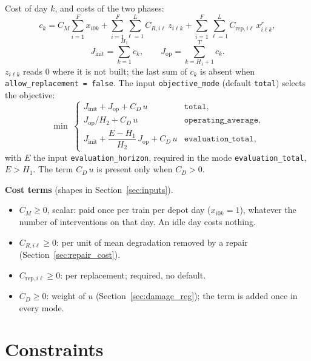Cost of day $k$, and costs of the two phases:
\begin{equation}
  c_k = C_M \sum_{i=1}^{F} x_{i0k}
      + \sum_{i=1}^{F}\sum_{\ell=1}^{L} C_{R,i\ell}\, z_{i\ell k}
      + \sum_{i=1}^{F}\sum_{\ell=1}^{L} C_{\mathrm{rep},i\ell}\, x^r_{i\ell k},
  \label{eq:a_daycost}
\end{equation}
\begin{equation}
  J_{\mathrm{init}} = \sum_{k=1}^{H_1} c_k, \qquad
  J_{\mathrm{op}} = \sum_{k=H_1+1}^{T} c_k .
  \label{eq:a_phases}
\end{equation}
$z_{i\ell k}$ reads $0$ where it is not built; the last sum of $c_k$ is absent when
\texttt{allow\_replacement = false}. The input \texttt{objective\_mode} (default
\texttt{total}) selects the objective:
\begin{equation}
  \min\;
  \begin{cases}
    J_{\mathrm{init}} + J_{\mathrm{op}} + C_D\, u & \texttt{total}, \\[2pt]
    J_{\mathrm{op}} / H_2 + C_D\, u & \texttt{operating\_average}, \\[2pt]
    J_{\mathrm{init}} + \dfrac{E - H_1}{H_2}\, J_{\mathrm{op}} + C_D\, u
      & \texttt{evaluation\_total},
  \end{cases}
  \label{eq:a_objective}
\end{equation}
with $E$ the input \texttt{evaluation\_horizon}, required in the mode
\texttt{evaluation\_total}, $E > H_1$. The term $C_D\,u$ is present only when
$C_D > 0$.

\textbf{Cost terms} (shapes in Section~\ref{sec:inputs}).
\begin{itemize}[nosep,leftmargin=1.5em]
  \item $C_M \geq 0$, scalar: paid once per train per depot day ($x_{i0k} = 1$),
        whatever the number of interventions on that day. An idle day costs nothing.
  \item $C_{R,i\ell} \geq 0$: per unit of mean degradation removed by a repair
        (Section~\ref{sec:repair_cost}).
  \item $C_{\mathrm{rep},i\ell} \geq 0$: per replacement; required, no default.
  \item $C_D \geq 0$: weight of $u$ (Section~\ref{sec:damage_reg}); the term is added
        once in every mode.
\end{itemize}

\section{Constraints}
\label{sec:constraints}

